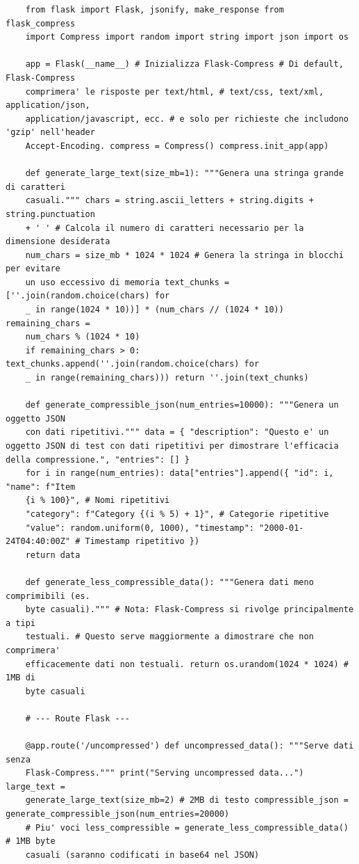 \begin{longlisting}
  \caption{Codice dell'applicazione Flask per il test di compressione}
  \label{lst:flask_compression_app} %
  \begin{verbatim}
    from flask import Flask, jsonify, make_response from flask_compress
    import Compress import random import string import json import os

    app = Flask(__name__) # Inizializza Flask-Compress # Di default, Flask-Compress
    comprimera' le risposte per text/html, # text/css, text/xml, application/json,
    application/javascript, ecc. # e solo per richieste che includono 'gzip' nell'header
    Accept-Encoding. compress = Compress() compress.init_app(app)

    def generate_large_text(size_mb=1): """Genera una stringa grande di caratteri
    casuali.""" chars = string.ascii_letters + string.digits + string.punctuation
    + ' ' # Calcola il numero di caratteri necessario per la dimensione desiderata
    num_chars = size_mb * 1024 * 1024 # Genera la stringa in blocchi per evitare
    un uso eccessivo di memoria text_chunks = [''.join(random.choice(chars) for
    _ in range(1024 * 10))] * (num_chars // (1024 * 10)) remaining_chars =
    num_chars % (1024 * 10)
    if remaining_chars > 0: text_chunks.append(''.join(random.choice(chars) for
    _ in range(remaining_chars))) return ''.join(text_chunks)

    def generate_compressible_json(num_entries=10000): """Genera un oggetto JSON
    con dati ripetitivi.""" data = { "description": "Questo e' un oggetto JSON di test con dati ripetitivi per dimostrare l'efficacia della compressione.", "entries": [] }
    for i in range(num_entries): data["entries"].append({ "id": i, "name": f"Item
    {i % 100}", # Nomi ripetitivi
    "category": f"Category {(i % 5) + 1}", # Categorie ripetitive
    "value": random.uniform(0, 1000), "timestamp": "2000-01-24T04:40:00Z" # Timestamp ripetitivo })
    return data

    def generate_less_compressible_data(): """Genera dati meno comprimibili (es.
    byte casuali).""" # Nota: Flask-Compress si rivolge principalmente a tipi
    testuali. # Questo serve maggiormente a dimostrare che non comprimera'
    efficacemente dati non testuali. return os.urandom(1024 * 1024) # 1MB di
    byte casuali

    # --- Route Flask ---

    @app.route('/uncompressed') def uncompressed_data(): """Serve dati senza
    Flask-Compress.""" print("Serving uncompressed data...") large_text =
    generate_large_text(size_mb=2) # 2MB di testo compressible_json = generate_compressible_json(num_entries=20000)
    # Piu' voci less_compressible = generate_less_compressible_data() # 1MB byte
    casuali (saranno codificati in base64 nel JSON)


\end{verbatim}
\end{longlisting}
